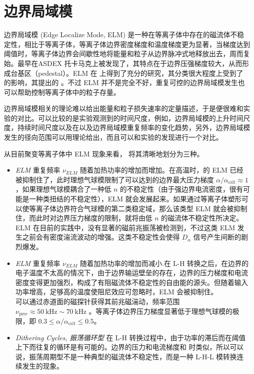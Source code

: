\section{边界局域模}
边界局域模 (Edge Localize Mode, ELM) 是一种在\Hmode 等离子体中存在的磁流体不稳定性，相比于\Lmode 等离子体，\Hmode 等离子体边界密度梯度和温度梯度更为显著，当梯度达到阈值时，等离子体边界会间歇性地将能量和粒子从边界脉冲式地释放出去，周而复始。\Hmode 最早在ASDEX 托卡马克上被发现了，其特点在于边界压强梯度较大，从而形成台基区（pedestal）。ELM 在 \ddd 上得到了充分的研究，其分类很大程度上受到了 \ddd 的影响，其提出的 。不过 ELM 并不是完全不好，重复可控的边界局域模发生也可以帮助控制等离子体中的粒子存量。



边界局域模相关的理论难以给出能量和粒子损失速率的定量描述，于是便很难和实验的对比。可以比较的是实验观测到的时间尺度，例如，边界局域模的上升时间尺度，持续时间尺度以及在以及边界局域模重复频率的变化趋势，另外，边界局域模发生的径向范围可以用理论给出，而且可以和实验的发现进行一个对比。

从目前聚变等离子体中 ELM 现象来看，\cite{zohm_edge_1996} 将其清晰地划分为三种。


\begin{itemize}
    \item \textit{\typeone ELM}  重复频率 $\nu_{ELM}$ 随着加热功率的增加而增加。在高温时，\typethr 的 ELM 已经被抑制住了，此时理想气球模限制了可以达到的边界最大压力梯度 $\alpha/\alpha_{\text{crit}}\approx 1$，如果理想气球模耦合了一种低 $n$ 的不稳定性（由于强边界电流密度，很有可能是一种类扭结的不稳定性），\typethr ELM 就会发展起来。如果通过等离子体塑形可以使等离子体边界符合气球模的第二类稳定域，那么该类型 ELM 就会被抑制住，而此时对边界压力梯度的限制，就将由低 $n$ 的磁流体不稳定性所决定。\\
    ELM 在目前的实践中，没有显著的磁前兆振荡被检测到，不过这类 ELM 发生之前会有密度湍流波动的增强。这类不稳定性会使得 $D_\alpha$ 信号产生间断的剧烈爆发。
    \item \textit{\typethr ELM} 重复频率 $\nu_{ELM}$ 随着加热功率的增加而减小.在 L-H 转换之后，在边界的电子温度不太高的情况下，由于边界输运壁垒的存在，边界的压力梯度和电流密度变得更加强烈，构成了有阻磁流体不稳定性的自由能的源头。但随着输入功率增高，足够高的温度使阻尼效应可忽略时，\typethr ELM 会被抑制住。\\
    可以通过赤道面的磁探针获得其前兆磁湍动，频率范围 $\nu_{\text{prec}}\approx \SI{50}{\kilo\hertz} \sim \SI{70}{\kilo\hertz}$ 。等离子体边界压力梯度显著低于理想气球模的极限，即 $0.3\leq \alpha/\alpha_{\text{crit}}\leq 0.5$。
    \item \textit{Dithering Cycles, 振荡循环型} 在 L-H 转换过程中，由于\Hmode 功率的滞后而在阈值上下而往复的循环是有可能的。边界的压力和电流梯度和 \Lmode 时类似，所以可以说，振荡周期型不是一种典型的磁流体不稳定性，而是一种 L-H-L 模转换连续发生的现象。
\end{itemize}

